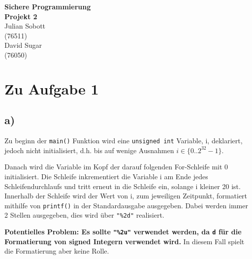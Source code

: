 \documentclass[12pt]{article}
\begin{document}
\begin{center}
  \textbf{\LARGE Sichere Programmierung} \\[1ex]%
  \textbf{\Large Projekt 2}\\[2ex] %
  Julian Sobott \\ %
  (76511) \\ %
  David Sugar \\ %
  (76050) \\ %
  
\end{center}

\section{Zu Aufgabe 1}
\subsection{a)}
Zu beginn der \texttt{main()} Funktion wird eine \texttt{unsigned int} Variable, i, deklariert, jedoch nicht initialisiert, d.h. bis auf wenige Ausnahmen $i \in \{0..2^{32}-1\}$.

Danach wird die Variable im Kopf der darauf folgenden For-Schleife mit 0 initialisiert. Die Schleife inkrementiert die Variable i am Ende jedes Schleifendurchlaufs und tritt erneut in die Schleife ein, solange i kleiner 20 ist.
Innerhalb der Schleife wird der Wert von i, zum jeweiligen Zeitpunkt, formatiert mithilfe von \texttt{printf()} in der Standardausgabe ausgegeben. Dabei werden immer 2 Stellen ausgegeben, dies wird über \texttt{"\%2d"} realisiert.

\textbf{Potentielles Problem: Es sollte \texttt{"\%2u"} verwendet werden, da \texttt{d} für die Formatierung von signed Integern verwendet wird.} In diesem Fall spielt die Formatierung aber keine Rolle.
\end{document}
